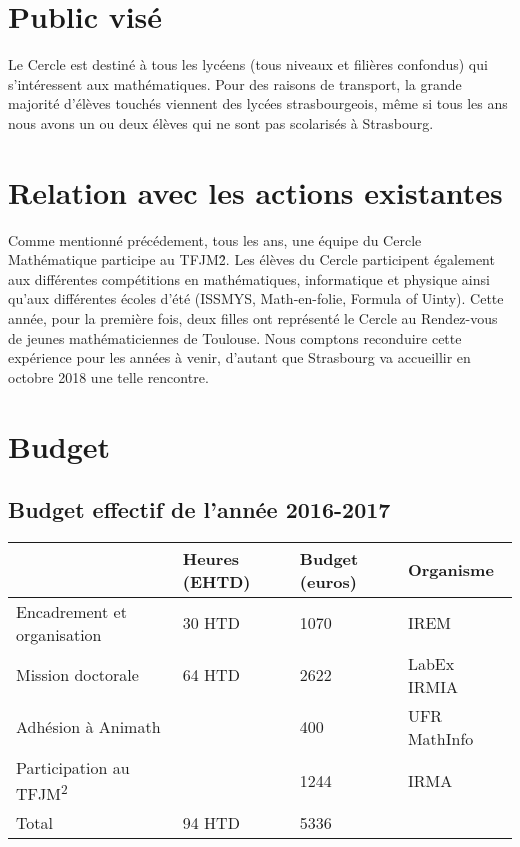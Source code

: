 \documentclass[11pt,notitlepage]{article}
\begin{document}
\section{Public vis\'e}

Le Cercle est destin\'e \`a tous les lyc\'eens (tous niveaux et fili\`eres confondus) qui s'int\'eressent aux math\'ematiques. Pour des raisons de transport, la grande majorit\'e d'\'el\`eves 
touch\'es viennent des lyc\'ees strasbourgeois, m\^eme si tous les ans nous avons un ou deux \'el\`eves qui ne sont pas scolaris\'es \`a Strasbourg. 

\section{Relation avec les actions existantes}
Comme mentionn\'e pr\'ec\'edement, tous les ans, une \'equipe du Cercle Math\'ematique participe au TFJM\^2. Les \'el\`eves du Cercle participent \'egalement 
aux diff\'erentes comp\'etitions en math\'ematiques, informatique et physique ainsi qu'aux diff\'erentes \'ecoles d'\'et\'e (ISSMYS, Math-en-folie, Formula of Uinty). 
Cette ann\'ee, pour la premi\`ere fois, deux filles ont repr\'esent\'e le Cercle au Rendez-vous de jeunes math\'ematiciennes de Toulouse. Nous comptons reconduire cette exp\'erience
 pour les ann\'ees \`a venir, d'autant que Strasbourg va accueillir en octobre 2018 une telle rencontre.


\section{Budget}

\subsection{Budget effectif de l'ann\'ee 2016-2017}

\begin{center}
	\begin{tabular}{|p{4 cm}|p{2cm}|p{2cm}|l|}
	\hline
	& Heures (EHTD) & Budget (euros) & Organisme\\
	\hline
	Encadrement et organisation& 30 HTD& 1070 & IREM\\
	\hline 
	Mission doctorale & 64 HTD &2622 & LabEx IRMIA\\
	\hline 
	Adh\'esion \`a Animath& & 400 & UFR MathInfo\\
	\hline
	Participation au TFJM\textsuperscript{2}& & 1244 & IRMA\\
	\hline
	Total & 94 HTD&  5336& \\
	\hline	
\end{tabular}
\end{center}
\end{document}
